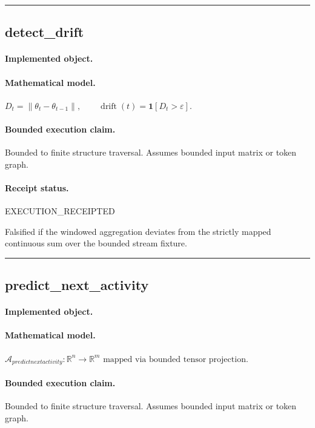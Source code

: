 \vspace{1em}\hrule\vspace{1em}
\subsection{detect\_drift}
\paragraph{Implemented object.} 
\paragraph{Mathematical model.} $D_t=\|\theta_t-\theta_{t-1}\|, \qquad \operatorname{drift}(t)=\mathbf{1}[D_t>\varepsilon].$
\paragraph{Bounded execution claim.} Bounded to finite structure traversal. Assumes bounded input matrix or token graph.
\paragraph{Receipt status.} EXECUTION\_RECEIPTED
\begin{falsifier}
Falsified if the windowed aggregation deviates from the strictly mapped continuous sum over the bounded stream fixture.
\end{falsifier}

\vspace{1em}\hrule\vspace{1em}
\subsection{predict\_next\_activity}
\paragraph{Implemented object.} 
\paragraph{Mathematical model.} $\mathcal{A}_{predictnextactivity} : \mathbb{R}^{n} \to \mathbb{R}^{m} \text{ mapped via bounded tensor projection}.$
\paragraph{Bounded execution claim.} Bounded to finite structure traversal. Assumes bounded input matrix or token graph.
